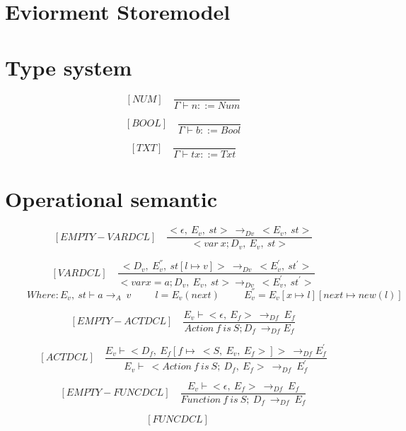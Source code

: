   
  \section{Eviorment Storemodel}
  
  \section{Type system}
  
	\[
	[NUM] \quad
	\dfrac{}{\Gamma \vdash n ::= Num}
	\]
	 
	\[
	[BOOL] \quad
	\dfrac{}{\Gamma \vdash b ::= Bool}
	\]
	
  	\[
  	[TXT] \quad
  	\dfrac{}{\Gamma \vdash tx ::= Txt}
  	\]
  	
  \section{Operational semantic}
  	\[
	[EMPTY-VARDCL] \quad
	\dfrac{<\epsilon, \ E_v, \ st> \ \rightarrow_{Dv} \ <E_v, \ st> }{<var \ x; D_v,\ E_v,\ st>}
	\]
    	
   	\[
   	[VARDCL] \quad
   	\dfrac{<D_v, \ E_v^{''}, \ st[l \mapsto v]> \ \rightarrow_{Dv} \ <E_v^{'}, \ st^{'}> }{<var x = a; D_v,\ E_v,\ st> \rightarrow_{Dv} \ <E_v^{'}, \ st^{'}>}
   	\]
   	\begin{math}
 	  	\qquad \ Where: E_v, \ st \vdash a \rightarrow_A \ v
 	  	\qquad \ \ l = E_v(next)
 	  	\qquad \ \ E_v^{''} = E_v[x \mapsto l][next \mapsto new(l)]
   	\end{math}
    	
   	\[
   	[EMPTY-ACTDCL] \quad
   	\dfrac{E_v \vdash <\epsilon, \ E_f> \ \rightarrow_{Df} \ E_f}{ Action \ f \ is \ S; D_f \ \rightarrow_{Df} E_f }
   	\]
    	
    	
  	\[
   	[ACTDCL] \quad
   	\dfrac{E_v \vdash <D_f, \ E_f[f \mapsto \ <S, \ E_v, \ E_f>]>   \ \rightarrow_{Df} E^{'}_f}{E_v \vdash \ <Action \ f \ is \ S; \ D_f, \ E_f> \ \rightarrow_{Df} \ E_f^{'}}
   	\]
    	
   	\[
   	[EMPTY-FUNCDCL] \quad
   	\dfrac{E_v \vdash < \epsilon, \ E_f> \ \rightarrow_{Df} \ E_f}{Function \ f \ is \ S; \ D_f \ \rightarrow_{Df} \ E_f}
   	\]
    
  	\[
   	[FUNCDCL] \quad
   	\dfrac{}{}
   	\]